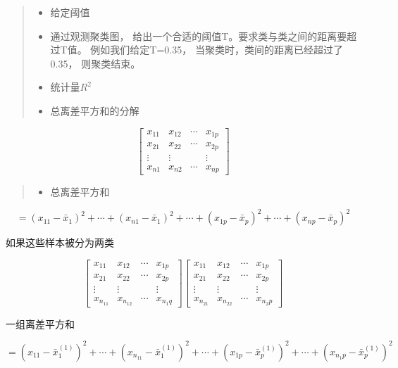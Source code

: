 \documentclass[]{ctexbook}
\providecommand{\tightlist}{%
  \setlength{\itemsep}{0pt}\setlength{\parskip}{0pt}}
\begin{document}
\begin{quote}
\begin{itemize}
\tightlist
\item
  给定阈值
\item
  通过观测聚类图， 给出一个合适的阈值T。要求类与类之间的距离要超过T值。 例如我们给定T=0.35， 当聚类时，类间的距离已经超过了0.35， 则聚类结束。
\item
  统计量\(R^2\)
\item
  总离差平方和的分解
\end{itemize}
\end{quote}

\[\begin{bmatrix} x_{11} & x_{12} & \cdots & x_{1p} \\ x_{21} & x_{22} & \cdots & x_{2p} \\ \vdots & \vdots &  & \vdots \\ x_{n1} & x_{n2} & \cdots & x_{np} \end{bmatrix}\]

\begin{quote}
\begin{itemize}
\tightlist
\item
  总离差平方和
\end{itemize}
\end{quote}

\[=(x_{11}-\bar x_1)^2+\cdots+(x_{n1}-\bar x_1)^2+\cdots+(x_{1p}-\bar x_p)^2+\cdots+(x_{np}-\bar x_p)^2\]

如果这些样本被分为两类

\[\begin{bmatrix} x_{11} & x_{12} & \cdots & x_{1p} \\ x_{21} & x_{22} & \cdots & x_{2p} \\ \vdots & \vdots &  & \vdots \\ x_{n_11} & x_{n_12} & \cdots & x_{n_1q} \end{bmatrix} \begin{bmatrix} x_{11} & x_{12} & \cdots & x_{1p} \\ x_{21} & x_{22} & \cdots & x_{2p} \\ \vdots & \vdots &  & \vdots \\ x_{n_21} & x_{n_22} & \cdots & x_{n_2p} \end{bmatrix}\]

一组离差平方和

\[=(x_{11}-\bar x_1^{(1)})^2+\cdots+(x_{n_11}-\bar x_1^{(1)})^2+\cdots+(x_{1p}-\bar x_p^{(1)})^2+\cdots+(x_{n_1p}-\bar x_p^{(1)})^2\]
\end{document}
